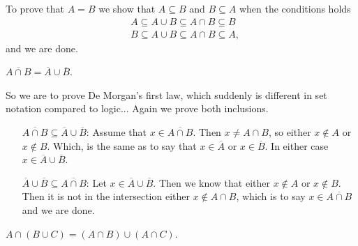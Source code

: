 \documentclass[a4paper, english, 12pt]{article} %
\begin{document}
\begin{answer}
  To prove that $A = B$ we show that $A \subseteq
  B$ and $B \subseteq A$ when the conditions holds
  \begin{align*}
    & A \subseteq A \cup B \subseteq A \cap B \subseteq B  \\
    & B \subseteq A \cup B \subseteq A \cap B \subseteq A,
  \end{align*}
  and we are done.
\end{answer}

\begin{subproblem}
  $\overline{A \cap B} = \overline{A} \cup \overline{B}$.
\end{subproblem}

\begin{answer}
  So we are to prove De Morgan's first law, which suddenly is different in set
  notation compared to logic... Again we prove both inclusions.
  \begin{enumerate}[align=left]
    \item[$ \overline{A \cap B} \subseteq \overline{A} \cup \overline{B}$:]
   Assume that $x \in \overline{A \cap B}$. Then $x \neq A \cap B$, so either
   $x\not \in A$ or $x \not \in B$. Which, is the same as to say that $x
  \in \overline{A}$ or $x \in \overline{B}$. In either case $x \in \overline{A}
  \cup \overline{B}$.
  \item[$\overline{A} \cup \overline{B} \subseteq \overline{A \cap B}$:]
    Let $x \in \overline{A} \cup \overline{B}$. Then we know that either $x \not
    \in A$ or $x \not \in B$. Then it is not in the intersection either $x \not
      \in A \cap B$, which is to say $x \in \overline{A \cap B}$ and we are done.
      \end{enumerate}
\end{answer}

\begin{subproblem}
  $A \cap (B \cup C) = (A \cap B) \cup (A \cap C)$.
\end{subproblem}
\end{document}
